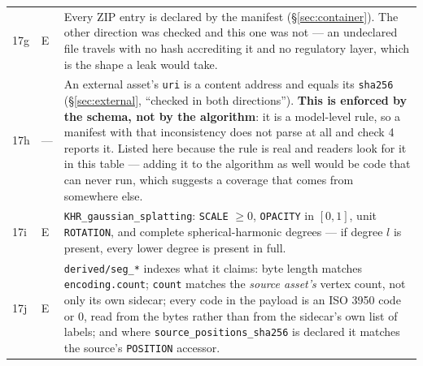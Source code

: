 \documentclass[11pt,a4paper]{article}
\newcommand{\code}[1]{\texttt{\small #1}}
\begin{document}
\begin{longtable}{C{0.8cm} C{0.9cm} L{13.4cm}}
17g & E & Every ZIP entry is declared by the manifest (\S\ref{sec:container}). The other
direction was checked and this one was not --- an undeclared file travels with no hash
accrediting it and no regulatory layer, which is the shape a leak would take.\\
17h & --- & An external asset's \code{uri} is a content address and equals its
\code{sha256} (\S\ref{sec:external}, ``checked in both directions''). \textbf{This is
enforced by the schema, not by the algorithm}: it is a model-level rule, so a manifest with
that inconsistency does not parse at all and check 4 reports it. Listed here because the
rule is real and readers look for it in this table --- adding it to the algorithm as well
would be code that can never run, which suggests a coverage that comes from somewhere
else.\\
17i & E & \code{KHR\_gaussian\_splatting}: \code{SCALE} $\geq 0$, \code{OPACITY} in
$[0,1]$, unit \code{ROTATION}, and complete spherical-harmonic degrees --- if degree $l$ is
present, every lower degree is present in full.\\
17j & E & \code{derived/seg\_*} indexes what it claims: byte length matches
\code{encoding.count}; \code{count} matches the \emph{source asset's} vertex count, not
only its own sidecar; every code in the payload is an ISO 3950 code or 0, read from the
bytes rather than from the sidecar's own list of labels; and where
\code{source\_positions\_sha256} is declared it matches the source's \code{POSITION}
accessor.\\


\end{longtable}
\end{document}
